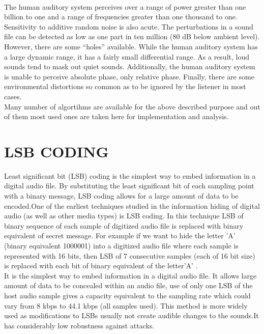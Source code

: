 \documentclass[a4paper, 12pt, notitlepage]{report}
\begin{document}
\begin{figure}[h!]
{\par}
\end{figure}\\

The human auditory system perceives over a range of power greater than one billion to one and a range of frequencies greater than one thousand to one. Sensitivity to additive random noise is also acute. The perturbations in a sound file can be detected as low as one part in ten million (80 dB below ambient level). However, there are some “holes” available. While the human auditory system has a large dynamic range, it has a fairly small differential range. As a result, loud sounds tend to mask out quiet sounds. Additionally, the human auditory system is unable to perceive absolute phase, only relative phase. Finally, there are some environmental distortions so common as to be ignored by the listener in most cases.\\
 
Many number of algortihms are available for the above described purpose and out of them most used ones are taken here for implementation and analysis.

\chapter{LSB CODING}
Least  significant  bit  (LSB)  coding  is  the  simplest  way  to embed  information  in  a  digital  audio  file.  By  substituting  the least  significant  bit  of  each  sampling  point  with  a  binary message,  LSB  coding  allows  for  a  large  amount  of  data  to  be encoded.One of the earliest techniques  studied  in  the  information  hiding  of  digital  audio  (as 
well  as  other  media types)  is  LSB  coding.  In  this  technique  LSB of  binary  sequence  of  each  sample  of  digitized  audio  file  is replaced with binary equivalent of secret message. For  example  if we want to hide the letter 'A' (binary equivalent 1000001)  into  a   digitized  audio  file  where  each  sample  is represented with 16 bits, then LSB of 7 consecutive samples (each of 16 bit size) is replaced with each bit of binary equivalent of the letter'A' .\\ 

It  is  the  simplest  way  to  embed  information  in  a digital  audio  file.  It  allows  large  amount  of  data  to  be  concealed within an audio file, use of only one LSB of the host audio sample gives a capacity equivalent to the sampling rate which could vary from 8  kbps to 44.1 kbps (all samples used). This method is more  widely  used  as  modifications  to  LSBs  usually  not  create audible  changes to  the  sounds.It  has  considerably low robustness against attacks.\\   
\end{document}
